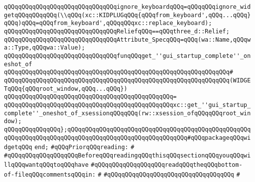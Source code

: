 \verb|qQQqqQQqqQQqqQQqqQQqqQQqqQQqqQQqignore_keyboardqQQq=qQQqqQQqignore_widgetqQQqqQQqqQQq(\\qQQq(xc::KIDPLUGqQQq{qQQqfrom_keyboard',qQQq...qQQq}qQQq)qQQq=qQQqfrom_keyboard',qQQqqQQqxc::replace_keyboard);|\newline
\newline
\verb|qQQqqQQqqQQqqQQqqQQqqQQqqQQqqQQqReliefqQQq==qQQqthree_d::Relief;|\newline
\newline
\verb|qQQqqQQqqQQqqQQqqQQqqQQqqQQqqQQqAttribute_SpecqQQq=qQQq(wa::Name,qQQqwa::Type,qQQqwa::Value);|\newline
\newline
\verb|qQQqqQQqqQQqqQQqqQQqqQQqqQQqqQQqfunqQQqget_''gui_startup_complete''_oneshot_of|\newline
\verb|qQQqqQQqqQQqqQQqqQQqqQQqqQQqqQQqqQQqqQQqqQQqqQQqqQQqqQQqqQQqqQQq#|\newline
\verb|qQQqqQQqqQQqqQQqqQQqqQQqqQQqqQQqqQQqqQQqqQQqqQQqqQQqqQQqqQQqqQQq(WIDGETqQQq{qQQqroot_window,qQQq...qQQq})|\newline
\verb|qQQqqQQqqQQqqQQqqQQqqQQqqQQqqQQqqQQqqQQqqQQqqQQq=|\newline
\verb|qQQqqQQqqQQqqQQqqQQqqQQqqQQqqQQqqQQqqQQqqQQqqQQqxc::get_''gui_startup_complete''_oneshot_of_xsessionqQQqqQQq(rw::xsession_ofqQQqqQQqroot_window);|\newline
\newline
\verb|qQQqqQQqqQQqqQQq};qQQqqQQqqQQqqQQqqQQqqQQqqQQqqQQqqQQqqQQqqQQqqQQqqQQqqQQqqQQqqQQqqQQqqQQqqQQqqQQqqQQqqQQqqQQqqQQqqQQqqQQq#qQQqpackageqQQqwidgetqQQq|\newline
\newline
\verb|end;|\newline
\newline
\newline
\verb|#qQQqPriorqQQqreading:|\newline
\verb|#|\newline
\verb|#qQQqqQQqqQQqqQQqqQQqBeforeqQQqreadingqQQqthisqQQqsectionqQQqyouqQQqwillqQQqwantqQQqtoqQQqhave|\newline
\verb|#qQQqqQQqqQQqqQQqqQQqreadqQQqtheqQQqbottom-of-fileqQQqcommentsqQQqin:|\newline
\verb|#|\newline
\verb|#qQQqqQQqqQQqqQQqqQQqqQQqqQQqqQQqqQQq|\newline
\verb|#|\newline
